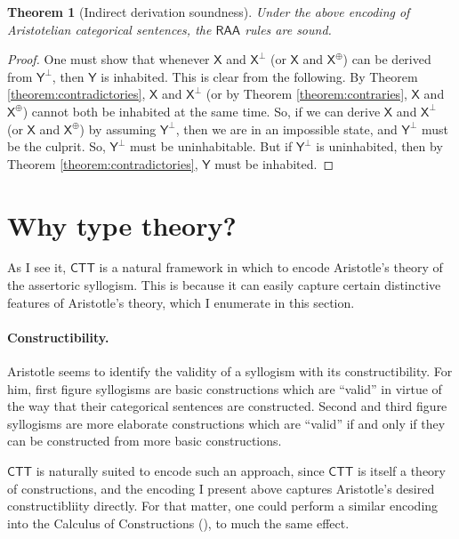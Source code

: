 \documentclass{article}
\newtheorem{theorem}{Theorem}
\newcommand\e{\mathsf}
\def\CTT/{$\e{CTT}$}
\def\Empty/{\e{\bot}}
\def\X/{\e{X}}
\def\Y/{\e{Y}}
\newcommand\Contradictory[1]{\e{#1^{\Empty/}}}
\newcommand\Contrary[1]{\e{#1^{\oplus}}}
\def\RAA/{$\e{RAA}$}
\begin{document}
\begin{theorem}[Indirect derivation soundness]
  Under the above encoding of Aristotelian categorical sentences, the \RAA/ rules are sound.
\end{theorem}

\begin{proof}
  One must show that whenever $\X/$ and $\Contradictory{X}$ (or $\X/$ and $\Contrary{X}$) can be derived from $\Contradictory{Y}$, then $\Y/$ is inhabited. This is clear from the following. By Theorem \ref{theorem:contradictories}, $\X/$ and $\Contradictory{X}$ (or by Theorem \ref{theorem:contraries}, $\X/$ and $\Contrary{X}$) cannot both be inhabited at the same time. So, if we can derive $\X/$ and $\Contradictory{X}$ (or $\X/$ and $\Contrary{X}$) by assuming $\Contradictory{Y}$, then we are in an impossible state, and $\Contradictory{Y}$ must be the culprit. So, $\Contradictory{Y}$ must be uninhabitable. But if $\Contradictory{Y}$ is uninhabited, then by Theorem \ref{theorem:contradictories}, $\Y/$ must be inhabited.
\end{proof}


\section{Why type theory?}
\label{sec:why-type-theory}

As I see it, \CTT/ is a natural framework in which to encode Aristotle's theory of the assertoric syllogism. This is because it can easily capture certain distinctive features of Aristotle's theory, which I enumerate in this section.


\paragraph{Constructibility.} 

Aristotle seems to identify the validity of a syllogism with its constructibility. For him, first figure syllogisms are basic constructions which are ``valid'' in virtue of the way that their categorical sentences are constructed. Second and third figure syllogisms are more elaborate constructions which are ``valid'' if and only if they can be constructed from more basic constructions.

\CTT/ is naturally suited to encode such an approach, since \CTT/ is itself a theory of constructions, and the encoding I present above captures Aristotle's desired constructibliity directly. For that matter, one could perform a similar encoding into the Calculus of Constructions (\citealt{CoquandHuet1988}), to much the same effect. 
\end{document}
